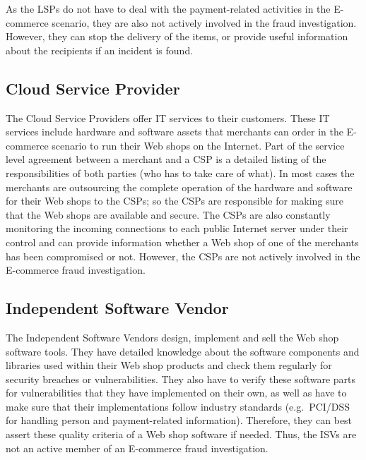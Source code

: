 As the \gls{LSP}s do not have to deal with the payment-related activities in the \gls{E-commerce} scenario, they are also not actively involved in the fraud investigation. However, they can stop the delivery of the items, or provide useful information about the recipients if an incident is found.


\subsection{Cloud Service Provider}
\label{subsec:stakeholder_csp}

The Cloud Service Providers offer \gls{IT} services to their customers. These \gls{IT} services include hardware and software assets that merchants can order in the \gls{E-commerce} scenario to run their Web shops on the Internet. Part of the service level agreement between a merchant and a \gls{CSP} is a detailed listing of the responsibilities of both parties (who has to take care of what). In most cases the merchants are outsourcing the complete operation of the hardware and software for their Web shops to the \gls{CSP}s; so the \gls{CSP}s are responsible for making sure that the Web shops are available and secure. The \gls{CSP}s are also constantly monitoring the incoming connections to each public Internet server under their control and can provide information whether a Web shop of one of the merchants has been compromised or not. However, the \gls{CSP}s are not actively involved in the \gls{E-commerce} fraud investigation.


\subsection{Independent Software Vendor}
\label{subsec:stakeholder_isv}

The Independent Software Vendors design, implement and sell the Web shop software tools. They have detailed knowledge about the software components and libraries used within their Web shop products and check them regularly for security breaches or vulnerabilities. They also have to verify these software parts for vulnerabilities that they have implemented on their own, as well as have to make sure that their implementations follow industry standards (e.g.\ \gls{PCI/DSS} for handling person and payment-related information). Therefore, they can best assert these quality criteria of a Web shop software if needed. Thus, the \gls{ISV}s are not an active member of an \gls{E-commerce} fraud investigation.

